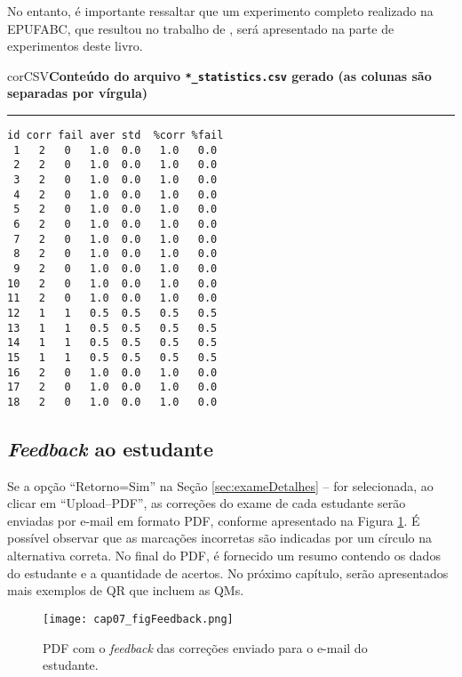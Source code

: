 No entanto, é importante ressaltar que um experimento completo realizado na EPUFABC, que resultou no trabalho de , será apresentado na parte de experimentos deste livro.

\begin{myboxCode}{corCSV}{\textbf{Conteúdo do arquivo \texttt{*\_statistics.csv} gerado (as colunas são separadas por vírgula)}}\vspace{3mm}
\hrule
{\footnotesize
\begin{verbatim}
id corr fail aver std  %corr %fail
 1   2   0   1.0  0.0   1.0   0.0
 2   2   0   1.0  0.0   1.0   0.0
 3   2   0   1.0  0.0   1.0   0.0
 4   2   0   1.0  0.0   1.0   0.0
 5   2   0   1.0  0.0   1.0   0.0
 6   2   0   1.0  0.0   1.0   0.0
 7   2   0   1.0  0.0   1.0   0.0
 8   2   0   1.0  0.0   1.0   0.0
 9   2   0   1.0  0.0   1.0   0.0
10   2   0   1.0  0.0   1.0   0.0
11   2   0   1.0  0.0   1.0   0.0
12   1   1   0.5  0.5   0.5   0.5
13   1   1   0.5  0.5   0.5   0.5
14   1   1   0.5  0.5   0.5   0.5
15   1   1   0.5  0.5   0.5   0.5
16   2   0   1.0  0.0   1.0   0.0
17   2   0   1.0  0.0   1.0   0.0
18   2   0   1.0  0.0   1.0   0.0
\end{verbatim}
}
\end{myboxCode}

\subsection{\textit{Feedback} ao estudante}


Se a opção ``Retorno=Sim'' na Seção \ref{sec:exameDetalhes} --  for selecionada, ao clicar em ``Upload--PDF'', as correções do exame de cada estudante serão enviadas por e-mail em formato PDF, conforme apresentado na Figura \ref{fig:cap07_figFeedback}. É possível observar que as marcações incorretas são indicadas por um círculo na alternativa correta. No final do PDF, é fornecido um resumo contendo os dados do estudante e a quantidade de acertos. No próximo capítulo, serão apresentados mais exemplos de QR que incluem as QMs.

\begin{figure}[htbp]
  \centering
  \texttt{[image: cap07\_figFeedback.png]}
    \caption{PDF com o \textit{feedback} das correções enviado para o e-mail do estudante.}
\label{fig:cap07_figFeedback}
\end{figure}



